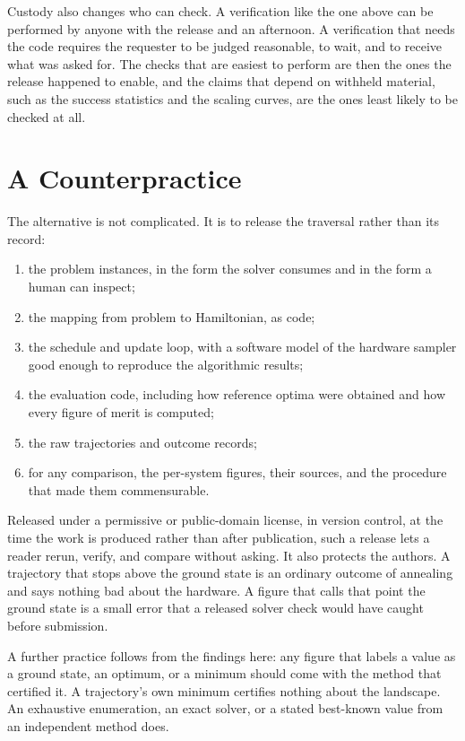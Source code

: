 \documentclass[11pt]{article}
\theoremstyle{definition}
\theoremstyle{remark}
\begin{document}
Custody also changes who can check. A verification like the one above can be performed by anyone with the release and an afternoon. A verification that needs the code requires the requester to be judged reasonable, to wait, and to receive what was asked for. The checks that are easiest to perform are then the ones the release happened to enable, and the claims that depend on withheld material, such as the success statistics and the scaling curves, are the ones least likely to be checked at all.

\section{A Counterpractice}

The alternative is not complicated. It is to release the traversal rather than its record:
\begin{enumerate}
\item the problem instances, in the form the solver consumes and in the form a human can inspect;
\item the mapping from problem to Hamiltonian, as code;
\item the schedule and update loop, with a software model of the hardware sampler good enough to reproduce the algorithmic results;
\item the evaluation code, including how reference optima were obtained and how every figure of merit is computed;
\item the raw trajectories and outcome records;
\item for any comparison, the per-system figures, their sources, and the procedure that made them commensurable.
\end{enumerate}
Released under a permissive or public-domain license, in version control, at the time the work is produced rather than after publication, such a release lets a reader rerun, verify, and compare without asking. It also protects the authors. A trajectory that stops above the ground state is an ordinary outcome of annealing and says nothing bad about the hardware. A figure that calls that point the ground state is a small error that a released solver check would have caught before submission.

A further practice follows from the findings here: any figure that labels a value as a ground state, an optimum, or a minimum should come with the method that certified it. A trajectory's own minimum certifies nothing about the landscape. An exhaustive enumeration, an exact solver, or a stated best-known value from an independent method does.
\end{document}
